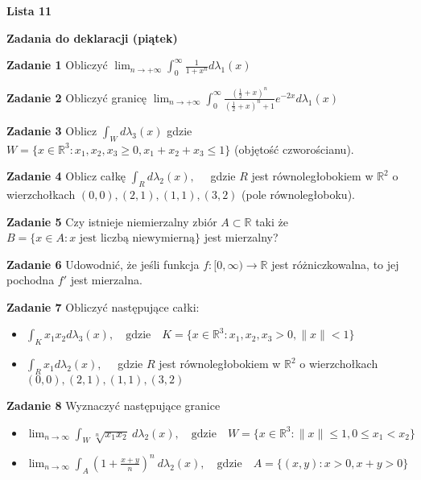 \documentclass[a4paper,11pt]{article}
\newcommand{\RR}{\mathbb{R}}
\begin{document}
\begin{center}
  {\large\textbf{Lista 11}}
\end{center}

\hrulefill
\begin{center}
    \textbf{Zadania do deklaracji (piątek)}
\end{center}

\bigskip

\textbf{Zadanie 1} Obliczyć $\lim_{n\to +\infty} \int_{0}^\infty
\frac{1}{1+x^n}d\lambda_1(x)$

\bigskip

\textbf{Zadanie 2} Obliczyć granicę 
$\lim_{n\to +\infty} \int_0^\infty
\frac{(\frac{1}{2}+x)^n}{(\frac{1}{2}+x)^n + 1} e^{-2x} d\lambda_1(x)$

\bigskip

\textbf{Zadanie 3} Oblicz $\int_W d \lambda_3(x)$ gdzie  $W = \{x \in
\RR^3: x_1,x_2,x_3 \ge 0, x_1+x_2+x_3 \le 1\} $ (objętość czworościanu).

\bigskip

\textbf{Zadanie 4} Oblicz całkę  $\int_{R} d \lambda_2(x), \quad$
gdzie $R$ jest równoległobokiem w $\RR^2$ o wierzchołkach $(0,0), (2,1),
(1,1), (3,2)$ (pole równoległoboku).

\bigskip

\hrulefill

\bigskip

\textbf{Zadanie 5} Czy istnieje niemierzalny zbiór $A \subset \RR$ taki że 
$B= \{x \in A : x \text{~jest liczbą niewymierną}\}$ jest mierzalny?

\bigskip

\textbf{Zadanie 6} Udowodnić, że jeśli funkcja $f : [0,\infty) \to \RR$
jest różniczkowalna, to jej pochodna $f'$ jest mierzalna.

\bigskip

\textbf{Zadanie 7} Obliczyć następujące całki:

\begin{itemize}
  \item $\int_K x_1 x_2 d \lambda_3(x), \quad \text{gdzie} \quad K = \{x
    \in \RR^3: x_1,x_2,x_3 > 0,  \|x\| < 1\} $
  \item $\int_{R} x_1 d \lambda_2(x), \quad$ gdzie $R$ jest
    równoległobokiem w $\RR^2$ o wierzchołkach $(0,0), (2,1), (1,1),
    (3,2)$
\end{itemize}

\bigskip

\textbf{Zadanie 8} Wyznaczyć następujące granice 

\begin{itemize}
  \item $\lim_{n \to \infty} \int_{W} \sqrt[n]{x_1x_2}~ d\lambda_2(x),
    \quad \text{gdzie} \quad W = \{x \in \RR^3: \|x\|\le 1, 0\le
    x_1<x_2\} $
  \item $\lim_{n \to \infty} \int_{A} \left( 1+\frac{x+y}{n} \right)^n ~
    d\lambda_2(x), \quad \text{gdzie} \quad A = \{(x,y) : x>0, x+y>0\} $
\end{itemize}
\end{document}
